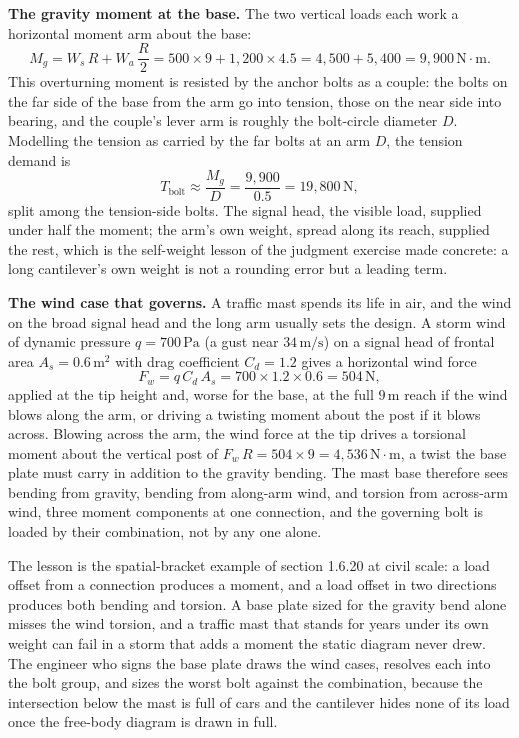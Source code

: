 \textbf{The gravity moment at the base.} The two vertical loads each work a
horizontal moment arm about the base:
\[
M_g = W_s\,R + W_a\,\frac{R}{2} = 500 \times 9 + 1{,}200 \times 4.5
= 4{,}500 + 5{,}400 = 9{,}900\,\text{N}\cdot\text{m}.
\]
This overturning moment is resisted by the anchor bolts as a couple: the bolts
on the far side of the base from the arm go into tension, those on the near
side into bearing, and the couple's lever arm is roughly the bolt-circle
diameter $D$. Modelling the tension as carried by the far bolts at an arm $D$,
the tension demand is
\[
T_{\text{bolt}} \approx \frac{M_g}{D} = \frac{9{,}900}{0.5}
= 19{,}800\,\text{N},
\]
split among the tension-side bolts. The signal head, the visible load, supplied
under half the moment; the arm's own weight, spread along its reach, supplied
the rest, which is the self-weight lesson of the judgment exercise made
concrete: a long cantilever's own weight is not a rounding error but a leading
term.

\textbf{The wind case that governs.} A traffic mast spends its life in air, and
the wind on the broad signal head and the long arm usually sets the design. A
storm wind of dynamic pressure $q = 700\,\text{Pa}$ (a gust near $34\,\text{m/s}$)
on a signal head of frontal area $A_s = 0.6\,\si{\meter\squared}$ with drag
coefficient $C_d = 1.2$ gives a horizontal wind force
\[
F_w = q\,C_d\,A_s = 700 \times 1.2 \times 0.6 = 504\,\text{N},
\]
applied at the tip height and, worse for the base, at the full $9\,\si{\meter}$
reach if the wind blows along the arm, or driving a twisting moment about the
post if it blows across. Blowing across the arm, the wind force at the tip
drives a torsional moment about the vertical post of $F_w\,R = 504 \times 9 =
4{,}536\,\text{N}\cdot\text{m}$, a twist the base plate must carry in addition
to the gravity bending. The mast base therefore sees bending from gravity,
bending from along-arm wind, and torsion from across-arm wind, three moment
components at one connection, and the governing bolt is loaded by their
combination, not by any one alone.

The lesson is the spatial-bracket example of section 1.6.20 at civil scale: a
load offset from a connection produces a moment, and a load offset in two
directions produces both bending and torsion. A base plate sized for the
gravity bend alone misses the wind torsion, and a traffic mast that stands for
years under its own weight can fail in a storm that adds a moment the static
diagram never drew. The engineer who signs the base plate draws the wind cases,
resolves each into the bolt group, and sizes the worst bolt against the
combination, because the intersection below the mast is full of cars and the
cantilever hides none of its load once the free-body diagram is drawn in full.

